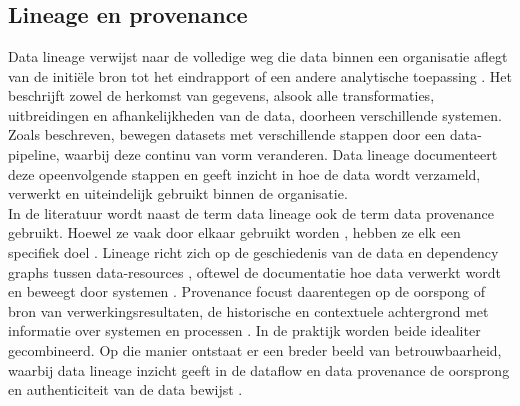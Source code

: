 \chapter{}%
\label{ch:stand-van-zaken}





\section{Lineage en provenance}
\label{sec:lineage-provenance}

Data lineage verwijst naar de volledige weg die data binnen een organisatie aflegt van de initiële bron tot het eindrapport of een andere analytische toepassing \autocite{VLAIO}. Het beschrijft zowel de herkomst van gegevens, alsook alle transformaties, uitbreidingen en afhankelijkheden van de data, doorheen verschillende systemen. Zoals \textcite{verma2024tracing} beschreven, bewegen datasets met verschillende stappen door een data-pipeline, waarbij deze continu van vorm veranderen. Data lineage documenteert deze opeenvolgende stappen en geeft inzicht in hoe de data wordt verzameld, verwerkt en uiteindelijk gebruikt binnen de organisatie.\\


In de literatuur wordt naast de term data lineage ook de term data provenance gebruikt. Hoewel ze vaak door elkaar gebruikt worden \autocite{mayernik2013data}, hebben ze elk een specifiek doel \autocite{infobelpro2025}. Lineage richt zich op de geschiedenis van de data en dependency graphs tussen data-resources \autocite{mayernik2013data}, oftewel de documentatie hoe data verwerkt wordt en beweegt door systemen \autocite{patel2020data}. Provenance focust daarentegen op de oorspong of bron van verwerkingsresultaten, de historische en contextuele achtergrond met informatie over systemen en processen \autocite{mayernik2013data,patel2020data}. In de praktijk worden beide idealiter gecombineerd. Op die manier ontstaat er een breder beeld van betrouwbaarheid, waarbij data lineage inzicht geeft in de dataflow en data provenance de oorsprong en authenticiteit van de data bewijst \autocite{infobelpro2025}.\\



